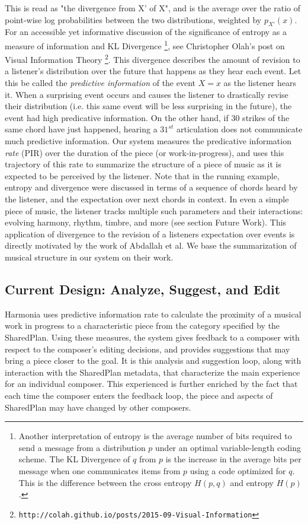\documentclass[final,authoryear,5p,times,twocolumn]{elsarticle}
\begin{document}
\noindent This is read as "the divergence from X' of X", and is the average over the ratio of point-wise log probabilities between the two distributions, weighted by $p_{X'}(x)$. For an accessible yet informative discussion of the significance of entropy as a measure of information and KL Divergence  \footnote{Another interpretation of entropy is the average number of bits required to send a message from a distribution $p$ under an optimal variable-length coding scheme. The KL Divergence of $q$ from $p$ is the increase in the average bits per message when one communicates items from $p$ using a code optimized for $q$. This is the difference between the cross entropy $H(p,q)$ and entropy $H(p)$.}, see Christopher Olah's post on Visual Information Theory \footnote{\texttt{http://colah.github.io/posts/2015-09-Visual-Information}}. This divergence describes the amount of revision to a listener's distribution over the future that happens as they hear each event. Let this be called the \textit{predictive information} of the event $X=x$ as the listener hears it. When a surprising event occurs and causes the listener to drastically revise their distribution (i.e. this same event will be less surprising in the future), the event had high predicative information. On the other hand, if $30$ strikes of the same chord have just happened, hearing a $31^{st}$ articulation does not communicate much predictive information. Our system measures the predicative information \textit{rate} (PIR) over the duration of the piece (or work-in-progress), and uses this trajectory of this rate to summarize the structure of a piece of music as it is expected to be perceived by the listener. Note that in the running example, entropy and divergence were discussed in terms of a sequence of chords heard by the listener, and the expectation over next chords in context. In even a simple piece of music, the listener tracks multiple such parameters and their interactions: evolving harmony, rhythm, timbre, and more (see section Future Work). This application of divergence to the revision of a listeners expectation over events is directly motivated by the work of  Abdallah et al. We base the summarization of musical structure in our system on their work.


\subsection{Current Design: Analyze, Suggest, and Edit}

Harmonia uses predictive information rate to calculate the proximity of a musical work in progress to a characteristic piece from the category specified by the SharedPlan. Using these measures, the system gives feedback to a composer with respect to the composer's editing decisions, and provides suggestions that may bring a piece closer to the goal. It is this analysis and suggestion loop, along with interaction with the SharedPlan metadata, that characterize the main experience for an individual composer. This experienced is further enriched by the fact that each time the composer enters the feedback loop, the piece and aspects of SharedPlan may have changed by other composers.
\end{document}
